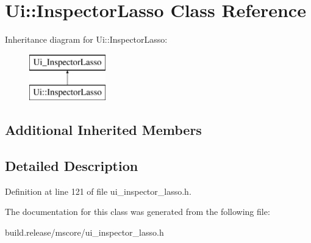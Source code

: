 \hypertarget{class_ui_1_1_inspector_lasso}{}\section{Ui\+:\+:Inspector\+Lasso Class Reference}
\label{class_ui_1_1_inspector_lasso}
Inheritance diagram for Ui\+:\+:Inspector\+Lasso\+:\begin{figure}[H]
\begin{center}
\leavevmode
\includegraphics[height=2.000000cm]{class_ui_1_1_inspector_lasso}
\end{center}
\end{figure}
\subsection*{Additional Inherited Members}


\subsection{Detailed Description}


Definition at line 121 of file ui\+\_\+inspector\+\_\+lasso.\+h.



The documentation for this class was generated from the following file\+:\begin{DoxyCompactItemize}
\item 
build.\+release/mscore/ui\+\_\+inspector\+\_\+lasso.\+h\end{DoxyCompactItemize}
